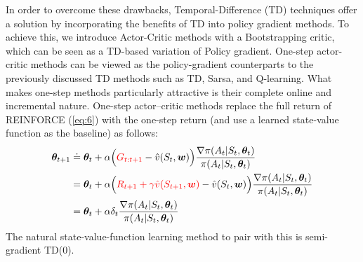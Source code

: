 {In order to overcome these drawbacks, Temporal-Difference (TD) techniques offer a solution by incorporating the benefits of TD into policy gradient methods. To achieve this, we introduce Actor-Critic methods with a Bootstrapping critic, which can be seen as a TD-based variation of Policy gradient.
One-step actor-critic methods can be viewed as the policy-gradient counterparts to the previously discussed TD methods such as TD, Sarsa, and Q-learning. What makes one-step methods particularly attractive is their complete online and incremental nature.
One-step actor–critic methods replace the full return
of REINFORCE (\ref{eq:6}) with the one-step return (and use a learned state-value function
as the baseline) as follows:
\begin{align*}
    \bm{\theta}_{t+1}&\doteq\bm{\theta}_{t}+\alpha\Big(\textcolor{red}{G_{t:t+1}}-\hat{v}(S_t, \bm{w})\Big)\frac{\nabla\pi(A_t|S_t, \bm{\theta}_t)}{\pi(A_t|S_t, \bm{\theta}_t)}\\
    &=\bm{\theta}_{t}+\alpha\Big(\textcolor{red}{R_{t+1}+\gamma\hat{v}(S_{t+1}, \bm{w})}-\hat{v}(S_t, \bm{w})\Big)\frac{\nabla\pi(A_t|S_t, \bm{\theta}_t)}{\pi(A_t|S_t, \bm{\theta}_t)}\\
    &=\bm{\theta}_{t}+\alpha\delta_t\frac{\nabla\pi(A_t|S_t, \bm{\theta}_t)}{\pi(A_t|S_t, \bm{\theta}_t)}
\end{align*}
The natural state-value-function learning method to pair with this is semi-gradient TD(0).
\newcommand\drawNodes[2]{
  \foreach \neurons [count=\lyrIdx] in #2 {
    \StrCount{\neurons}{,}[\lyrLength] %
    \foreach \n [count=\nIdx] in \neurons
      \node[neuron] (#1-\lyrIdx-\nIdx) at (2*\lyrIdx, \lyrLength/2-1.4*\nIdx) {\n};
  }
}

\newcommand\denselyConnectNodes[2]{
  \foreach \n [count=\lyrIdx, remember=\lyrIdx as \previdx, remember=\n as \prevn] in #2 {
    \foreach \y in {1,...,\n} {
      \ifnum \lyrIdx > 1
        \foreach \x in {1,...,\prevn}
          \draw[->] (#1-\previdx-\x) -- (#1-\lyrIdx-\y);
      \fi
    }
  }
}
\vspace{1cm}
}
